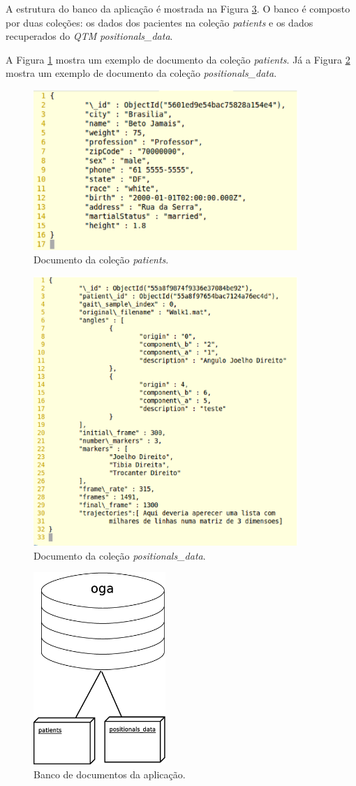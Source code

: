 A estrutura do banco da aplicação é mostrada na Figura \ref{mongo_oga}. 
O banco é composto por duas coleções: os dados dos pacientes na coleção \emph{patients} e os dados recuperados do \emph{QTM} \emph{positionals\_data}.

A Figura \ref{listagem2}  mostra um exemplo de documento da coleção \emph{patients}.
Já a Figura \ref{listagem3}  mostra um exemplo de documento da coleção \emph{positionals\_data}.

\begin{figure}[ht]
	\centering
	\includegraphics[width=10cm]{figuras/listagem2.eps}
	\caption{Documento da coleção \emph{patients}.}
	\label{listagem2}
\end{figure}

\begin{figure}[ht]
	\centering
	\includegraphics[width=10cm]{figuras/listagem3.eps}
	\caption{Documento da coleção \emph{positionals\_data}.}
	\label{listagem3}
\end{figure}


\begin{figure}[ht]
	\centering
	\includegraphics[width=5cm]{figuras/mongo_oga.eps}
	\caption{Banco de documentos da aplicação.}
	\label{mongo_oga}
\end{figure}

